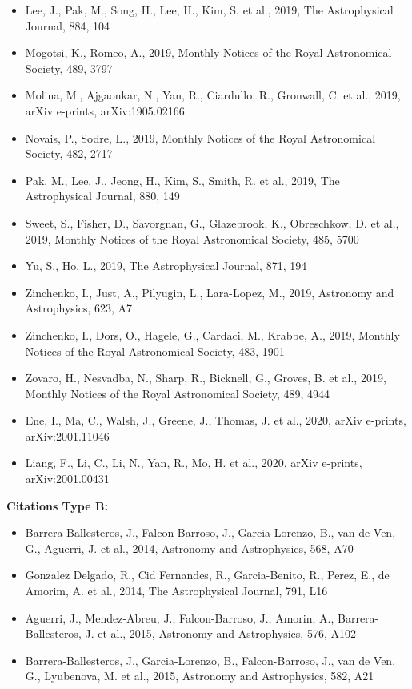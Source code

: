 \documentclass{letter}
\begin{document}
\begin{enumerate}
\begin{itemize}
\item Lee, J., Pak, M., Song, H., Lee, H., Kim, S. et al., 2019, The Astrophysical Journal, 884, 104
\item Mogotsi, K., Romeo, A., 2019, Monthly Notices of the Royal Astronomical Society, 489, 3797
\item Molina, M., Ajgaonkar, N., Yan, R., Ciardullo, R., Gronwall, C. et al., 2019, arXiv e-prints, arXiv:1905.02166
\item Novais, P., Sodre, L., 2019, Monthly Notices of the Royal Astronomical Society, 482, 2717
\item Pak, M., Lee, J., Jeong, H., Kim, S., Smith, R. et al., 2019, The Astrophysical Journal, 880, 149
\item Sweet, S., Fisher, D., Savorgnan, G., Glazebrook, K., Obreschkow, D. et al., 2019, Monthly Notices of the Royal Astronomical Society, 485, 5700
\item Yu, S., Ho, L., 2019, The Astrophysical Journal, 871, 194
\item Zinchenko, I., Just, A., Pilyugin, L., Lara-Lopez, M., 2019, Astronomy and Astrophysics, 623, A7
\item Zinchenko, I., Dors, O., Hagele, G., Cardaci, M., Krabbe, A., 2019, Monthly Notices of the Royal Astronomical Society, 483, 1901
\item Zovaro, H., Nesvadba, N., Sharp, R., Bicknell, G., Groves, B. et al., 2019, Monthly Notices of the Royal Astronomical Society, 489, 4944
\item Ene, I., Ma, C., Walsh, J., Greene, J., Thomas, J. et al., 2020, arXiv e-prints, arXiv:2001.11046
\item Liang, F., Li, C., Li, N., Yan, R., Mo, H. et al., 2020, arXiv e-prints, arXiv:2001.00431
\end{itemize}
{\bf Citations Type B:}
\begin{itemize}
\item Barrera-Ballesteros, J., Falcon-Barroso, J., Garcia-Lorenzo, B., van de Ven, G., Aguerri, J. et al., 2014, Astronomy and Astrophysics, 568, A70
\item Gonzalez Delgado, R., Cid Fernandes, R., Garcia-Benito, R., Perez, E., de Amorim, A. et al., 2014, The Astrophysical Journal, 791, L16
\item Aguerri, J., Mendez-Abreu, J., Falcon-Barroso, J., Amorin, A., Barrera-Ballesteros, J. et al., 2015, Astronomy and Astrophysics, 576, A102
\item Barrera-Ballesteros, J., Garcia-Lorenzo, B., Falcon-Barroso, J., van de Ven, G., Lyubenova, M. et al., 2015, Astronomy and Astrophysics, 582, A21

\end{itemize}
\end{enumerate}
\end{document}
